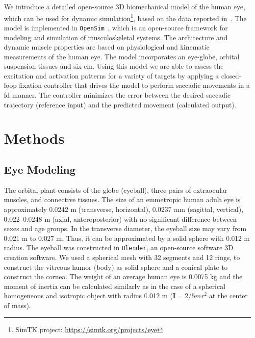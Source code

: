 \documentclass[11pt,a4paper,draft=false]{report}
\newcommand{\mat}[1]{\bm{#1}}
\begin{document}
We introduce a detailed open-source 3D biomechanical model of the human eye,
which can be used for dynamic simulation\footnote{SimTK project:
  \url{https://simtk.org/projects/eye}}, based on the data reported
in~\cite{Iskander2018}. The model is implemented in
\texttt{OpenSim}~\cite{Delp2007}, which is an open-source framework for modeling
and simulation of musculoskeletal systems. The architecture and dynamic muscle
properties are based on physiological and kinematic measurements of the human
eye. The model incorporates an eye-globe, orbital suspension tissues and six
\gls{em}. Using this model we are able to assess the excitation and activation
patterns for a variety of targets by applying a closed-loop fixation controller
that drives the model to perform saccadic movements in a \gls{fd} manner. The
controller minimizes the error between the desired saccadic trajectory
(reference input) and the predicted movement (calculated output).

\section*{Methods}\label{sec:methods}

\subsection*{Eye Modeling}\label{sec:eye-Modeling}

The orbital plant consists of the globe (eyeball), three pairs of extraocular
muscles, and connective tissues. The size of an emmetropic human adult eye is
approximately 0.0242 m (transverse, horizontal), 0.0237 mm (sagittal, vertical),
0.022–0.0248 m (axial, anteroposterior) with no significant difference between
sexes and age groups. In the transverse diameter, the eyeball size may vary from
0.021 m to 0.027 m. Thus, it can be approximated by a solid sphere with 0.012 m
radius. The eyeball was constructed in \texttt{Blender}, an open-source software
3D creation software. We used a spherical mesh with 32 segments and 12 rings, to
construct the vitreous humor (body) as solid sphere and a conical plate to
construct the cornea. The weight of an average human eye is 0.0075 kg and the
moment of inertia can be calculated similarly as in the case of a spherical
homogeneous and isotropic object with radius 0.012 m ($\mat{I} = 2/5 m r^2$ at
the center of mass). 
\end{document}
